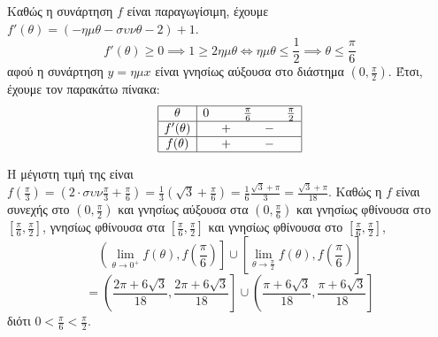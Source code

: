 \begin{alist}
    \item Καθώς η συνάρτηση $f$ είναι παραγωγίσιμη, έχουμε $f'(\theta) = (-\eta\mu\theta - \sigma\upsilon\nu\theta - 2) + 1$.
    \[ f'(\theta) \ge 0 \implies 1 \ge 2\eta\mu\theta \iff \eta\mu\theta \le \frac{1}{2} \implies \theta \le \frac{\pi}{6} \]
    αφού η συνάρτηση $y = \eta\mu x$ είναι γνησίως αύξουσα στο διάστημα $\left(0, \frac{\pi}{2}\right)$.
    Έτσι, έχουμε τον παρακάτω πίνακα:
    \[
    \begin{array}{|c|ccccc|}
    \hline
    \theta & 0 &  & \frac{\pi}{6} &  & \frac{\pi}{2} \\
    \hline
    f'(\theta) &  & + &  & - & \\
    \hline
    f(\theta) &  & + &  & - & \\
    \hline
    \end{array}
    \]

    \item Η μέγιστη τιμή της είναι $f\left(\frac{\pi}{3}\right) = \left(2 \cdot \sigma\upsilon\nu\frac{\pi}{3} + \frac{\pi}{6}\right) = \frac{1}{3}\left(\sqrt{3} + \frac{\pi}{6}\right) = \frac{1}{6}\frac{\sqrt{3}+\pi}{3} = \frac{\sqrt{3}+\pi}{18}$.
    Καθώς η $f$ είναι συνεχής στο $\left(0, \frac{\pi}{2}\right)$ και γνησίως αύξουσα στα $\left(0, \frac{\pi}{6}\right)$ και γνησίως φθίνουσα στο $\left[\frac{\pi}{6}, \frac{\pi}{2}\right]$, γνησίως φθίνουσα στα $\left[\frac{\pi}{6}, \frac{\pi}{2}\right]$ και γνησίως φθίνουσα στο $\left[\frac{\pi}{6}, \frac{\pi}{2}\right]$,
    \[ \left(\lim_{\theta\to 0^+} f(\theta), f\left(\frac{\pi}{6}\right)\right] \cup \left[ \lim_{\theta\to \frac{\pi}{2}} f(\theta), f\left(\frac{\pi}{6}\right)\right] \]
    \[ = \left( \frac{2\pi+6\sqrt{3}}{18}, \frac{2\pi+6\sqrt{3}}{18} \right] \cup \left( \frac{\pi+6\sqrt{3}}{18}, \frac{\pi+6\sqrt{3}}{18} \right] \]
    διότι $0 < \frac{\pi}{6} < \frac{\pi}{2}$.
\end{alist}